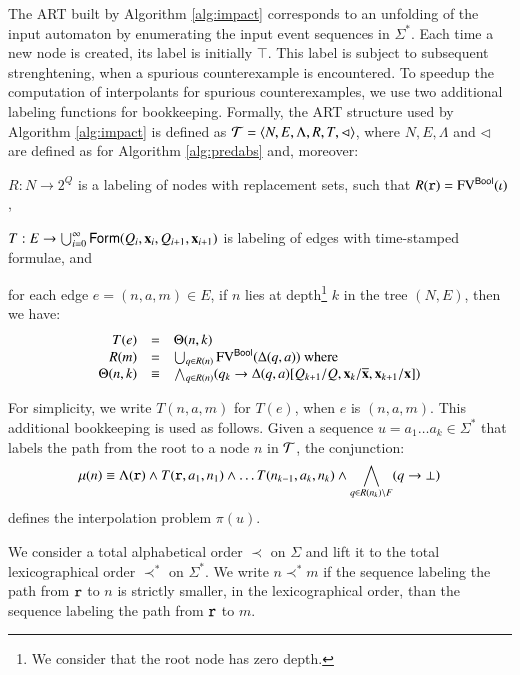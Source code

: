 \documentclass[10pt,conference,letterpaper,twocolumn]{IEEEtran}
\begin{document}
The ART built by Algorithm \ref{alg:impact} corresponds to an
unfolding of the input automaton by enumerating the input event
sequences in $\Sigma^*$. Each time a new node is created, its label is
initially $\top$. This label is subject to subsequent strenghtening,
when a spurious counterexample is encountered. To speedup the
computation of interpolants for spurious counterexamples, we use two
additional labeling functions for bookkeeping. Formally, the ART
structure used by Algorithm \ref{alg:impact} is defined as $\mathcal{T} =
\left\langle N,E,\Lambda,R,T,\lhd \right\rangle$, where $N,E,\Lambda$ and $\lhd$ are
defined as for Algorithm \ref{alg:predabs} and,
moreover: \begin{compactitem}
\item $R : N \rightarrow 2^Q$ is a labeling of nodes with replacement
  sets, such that $R(\mathtt{r}) = \mathrm{FV}^{\mathsf{Bool}}(\iota)$, 
%
\item $T : E \rightarrow \bigcup_{i=0}^\infty
  \mathsf{Form}(Q_i,\mathbf x_i,Q_{i+1},\mathbf x_{i+1})$ is labeling of edges
  with time-stamped formulae, and
%
\item for each edge $e = (n,a,m) \in E$, if $n$ lies at
  depth\footnote{We consider that the root node has zero depth.}  $k$
  in the tree $(N,E)$, then we have:
  \[\begin{array}{rcl}
  T(e) & = & \Theta(n,k) \\
  R(m) & = & \bigcup_{q \in R(n)}\mathrm{FV}^{\mathsf{Bool}}(\Delta(q,a)) \text{ where} \\
  \Theta(n,k) & \equiv & \bigwedge_{q \in R(n)} (q_k \rightarrow
  \Delta(q,a)[Q_{k+1}/Q,\mathbf x_{k}/\overline{\mathbf x},\mathbf x_{k+1}/\mathbf x])
  \end{array}\]
\end{compactitem}
For simplicity, we write $T(n,a,m)$ for $T(e)$, when $e$ is
$(n,a,m)$. This additional bookkeeping is used as follows. Given a
sequence $u = a_1\ldots a_k \in \Sigma^*$ that labels the path from
the root to a node $n$ in $\mathcal{T}$, the conjunction:
\[\mu(n) \equiv \Lambda(\mathtt{r}) \wedge T(\mathtt{r},a_1,n_1) \wedge \ldots
T(n_{k-1},a_k,n_k) \wedge \bigwedge_{q \in R(n_k) \setminus F}(q
\rightarrow \bot)\] defines the interpolation problem $\pi(u)$. 

We consider a total alphabetical order $\prec$ on $\Sigma$ and lift it
to the total lexicographical order $\prec^*$ on $\Sigma^*$. We write
$n \prec^* m$ if the sequence labeling the path from $\mathtt{r}$ to
$n$ is strictly smaller, in the lexicographical order, than the
sequence labeling the path from $\mathtt{r}$ to $m$. 
\end{document}
